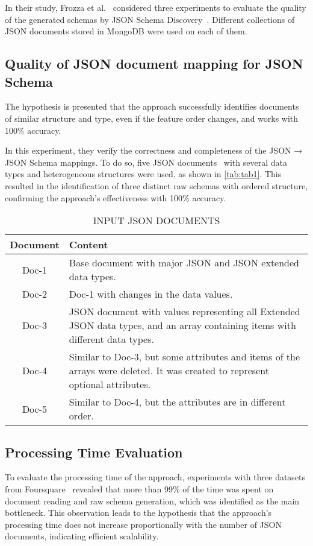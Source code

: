 \documentclass[sigconf, nonacm]{acmart}
\begin{document}
In their study, Frozza et al.~\cite{SchemaExtraction} considered three experiments to evaluate the quality of the generated schemas by JSON Schema Discovery~\cite{JSONSchemaDiscovery}.  Different collections of JSON documents stored in MongoDB were used on each of them.

\subsection{Quality of JSON document mapping for JSON Schema}
The hypothesis is presented that the approach successfully identifies documents of similar structure and type, even if the feature order changes, and works with 100\% accuracy.

 In this experiment, they verify the correctness and completeness of the JSON → JSON Schema mappings. To do so, five JSON documents~\cite{JsonDataDocs} with several data types and heterogeneous structures were used, as shown in \autoref{tab:tab1}. This resulted in the identification of three distinct raw schemas with ordered structure, confirming the approach's effectiveness with 100\% accuracy.
 
\begin{table}
  \caption{INPUT JSON DOCUMENTS}
  \label{tab:tab1}
  \begin{tabular}{|c|p{6cm}|} 
    \hline 
    Document & Content \\
    \hline 
    Doc-1 & Base document with major JSON and JSON extended data types. \\
    \hline 
    Doc-2 & Doc-1 with changes in the data values. \\
    \hline
    Doc-3 & JSON document with values representing all Extended JSON data types, and an array containing items with different data types. \\
    \hline
    Doc-4 & Similar to Doc-3, but some attributes and items of the arrays were deleted. It was created to represent optional attributes. \\
    \hline
    Doc-5 & Similar to Doc-4, but the attributes are in different order. \\
    \hline 
  \end{tabular}
\end{table}

\subsection{Processing Time Evaluation}
To evaluate the processing time of the approach, experiments with three datasets from Foursquare~\cite{su11030595} revealed that more than 99\% of the time was spent on document reading and raw schema generation, which was identified as the main bottleneck. This observation leads to the hypothesis that the approach's processing time does not increase proportionally with the number of JSON documents, indicating efficient scalability.
\end{document}
